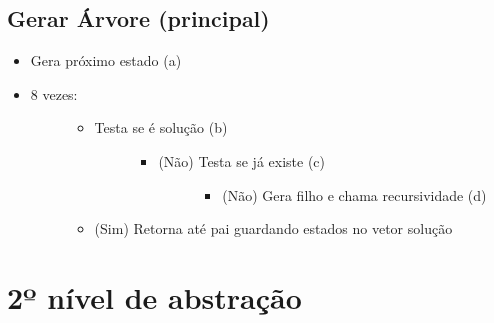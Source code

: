 \documentclass[letterpaper,10pt,openany,oneside,portuges]{sphinxmanual}
\begin{document}
\subsection{Gerar Árvore (principal)}
\label{\detokenize{pseudo:gerar-arvore-principal}}\begin{itemize}
\item {} 
Gera próximo estado  (a)

\item {} \begin{description}
\item[{8 vezes:}] \leavevmode\begin{itemize}
\item {} \begin{description}
\item[{Testa se é solução (b)}] \leavevmode\begin{itemize}
\item {} \begin{description}
\item[{(Não) Testa se já existe (c)}] \leavevmode\begin{itemize}
\item {} 
(Não) Gera filho e chama recursividade (d)

\end{itemize}

\end{description}

\end{itemize}

\end{description}

\item {} 
(Sim) Retorna até pai guardando estados no vetor solução

\end{itemize}

\end{description}

\end{itemize}


\section{2º nível de abstração}
\label{\detokenize{pseudo:o-nivel-de-abstracao}}
\end{document}
